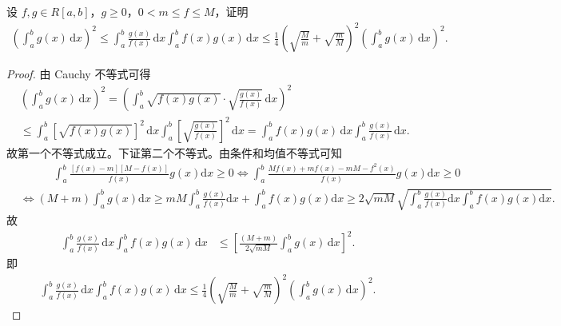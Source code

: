 \documentclass[../../main.tex]{subfiles}%
\begin{document}
\begin{proposition}[反向Cauchy不等式]\label{proposition:反向Cauchy不等式}
设 \(f,g \in R[a,b]\)，\(g \geqslant  0\)，\(0 < m \leqslant  f \leqslant  M\)，证明
\begin{align*}
\left( \int_a^b{g\left( x \right) \,\mathrm{d}x} \right) ^2\leqslant \int_a^b{\frac{g\left( x \right)}{f\left( x \right)}\,\mathrm{d}x\int_a^b{f\left( x \right) g\left( x \right) \,\mathrm{d}x\leqslant \frac{1}{4}\left( \sqrt{\frac{M}{m}}+\sqrt{\frac{m}{M}} \right) ^2\left( \int_a^b{g\left( x \right) \,\mathrm{d}x} \right) ^2}}.
\end{align*} 
\end{proposition}
\begin{proof}

由 Cauchy 不等式可得
\begin{align*}
&\left( \int_a^b g(x) \, \mathrm{d}x \right)^2 = \left( \int_a^b \sqrt{f(x) g(x)} \cdot \sqrt{\frac{g(x)}{f(x)}} \, \mathrm{d}x \right)^2 \\
&\leqslant \int_a^b \left[ \sqrt{f(x) g(x)} \right]^2 \, \mathrm{d}x \int_a^b \left[ \sqrt{\frac{g(x)}{f(x)}} \right]^2 \, \mathrm{d}x 
= \int_a^b f(x) g(x) \, \mathrm{d}x \int_a^b \frac{g(x)}{f(x)} \, \mathrm{d}x.
\end{align*}
故第一个不等式成立。下证第二个不等式。由条件和均值不等式可知
\begin{align*}
&\quad \quad \quad \int_a^b{\frac{\left[ f\left( x \right) -m \right] \left[ M-f\left( x \right) \right]}{f\left( x \right)}g\left( x \right) \mathrm{d}x}\geqslant 0\Longleftrightarrow \int_a^b{\frac{Mf\left( x \right) +mf\left( x \right) -mM-f^2\left( x \right)}{f\left( x \right)}g\left( x \right) \mathrm{d}x}\geqslant 0
\\
&\Longleftrightarrow \left( M+m \right) \int_a^b{g\left( x \right) \mathrm{d}x}\geqslant mM\int_a^b{\frac{g\left( x \right)}{f\left( x \right)}\mathrm{d}x}+\int_a^b{f\left( x \right) g\left( x \right) \mathrm{d}x}\geqslant 2\sqrt{mM}\sqrt{\int_a^b{\frac{g\left( x \right)}{f\left( x \right)}\mathrm{d}x}\int_a^b{f\left( x \right) g\left( x \right) \mathrm{d}x}}.
\end{align*}
故
\begin{align*}
\int_a^b \frac{g(x)}{f(x)} \, \mathrm{d}x \int_a^b f(x) g(x) \, \mathrm{d}x &\leqslant \left[ \frac{(M + m)}{2 \sqrt{m M}} \int_a^b g(x) \, \mathrm{d}x \right]^2.
\end{align*}
即
\begin{align*}
\int_a^b{\frac{g\left( x \right)}{f\left( x \right)}\,\mathrm{d}x\int_a^b{f\left( x \right) g\left( x \right) \,\mathrm{d}x\leqslant \frac{1}{4}\left( \sqrt{\frac{M}{m}}+\sqrt{\frac{m}{M}} \right) ^2\left( \int_a^b{g\left( x \right) \,\mathrm{d}x} \right) ^2}}.
\end{align*}

\end{proof}
\end{document}
